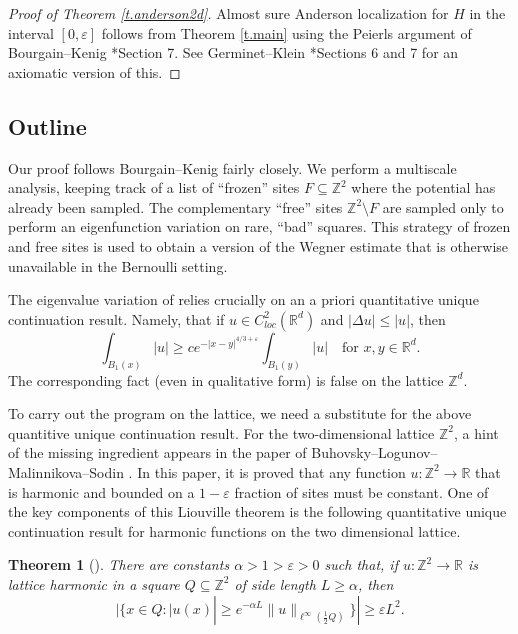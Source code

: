 \documentclass{amsart}
\newtheorem{theorem}[equation]{Theorem}
\newcommand{\tref}[1]{Theorem \ref{t.#1}}
\numberwithin{equation}{section}
\numberwithin{figure}{section}
\newcommand{\Z}{\mathbb{Z}}
\newcommand{\R}{\mathbb{R}}
\newcommand{\ep}{\varepsilon}
\begin{document}
\begin{proof}[Proof of \tref{anderson2d}]
Almost sure Anderson localization for $H$ in the interval $[0,\ep]$ follows from \tref{main} using the Peierls argument of Bourgain--Kenig \cite{Bourgain-Kenig}*{Section 7}.  See Germinet--Klein \cite{Germinet-Klein}*{Sections 6 and 7} for an axiomatic version of this.
\end{proof}

\subsection{Outline}

Our proof follows Bourgain--Kenig \cite{Bourgain-Kenig} fairly closely.  We perform a multiscale analysis, keeping track of a list of ``frozen'' sites $F \subseteq \Z^2$ where the potential has already been sampled.  The complementary ``free'' sites $\Z^2 \setminus F$ are sampled only to perform an eigenfunction variation on rare, ``bad'' squares.  This strategy of frozen and free sites is used to obtain a version of the Wegner estimate \cite{Wegner} that is otherwise unavailable in the Bernoulli setting.

The eigenvalue variation of \cite{Bourgain-Kenig} relies crucially on an a priori quantitative unique continuation result.  Namely, that if $u \in C^2_{loc}(\R^d)$ and $|\Delta u| \leq |u|$, then $$\int_{B_1(x)} |u| \geq c e^{-|x - y|^{4/3+\ep}} \int_{B_1(y)} |u| \quad \mbox{for } x, y \in \R^d.$$  The corresponding fact (even in qualitative form) is false on the lattice $\Z^d$.

To carry out the program on the lattice, we need a substitute for the above quantitive unique continuation result.  For the two-dimensional lattice $\Z^2$, a hint of the missing ingredient appears in the paper of Buhovsky--Logunov--Malinnikova--Sodin \cite{Buhovsky-Logunov-Malinnikova-Sodin}.  In this paper, it is proved that any function $u : \Z^2 \to \R$ that is harmonic and bounded on a $1-\ep$ fraction of sites must be constant.  One of the key components of this Liouville theorem is the following quantitative unique continuation result for harmonic functions on the two dimensional lattice.

\begin{theorem}[\cite{Buhovsky-Logunov-Malinnikova-Sodin}]
There are constants $\alpha > 1 > \ep > 0$ such that, if $u : \Z^2 \to \R$ is lattice harmonic in a square $Q \subseteq \Z^2$ of side length $L \geq \alpha$, then
\begin{equation*}
| \{ x \in Q : |u(x)| \geq e^{-\alpha L} \| u \|_{\ell^\infty(\frac12 Q)} \} | \geq \ep L^2.
\end{equation*}
\end{theorem}
\end{document}
